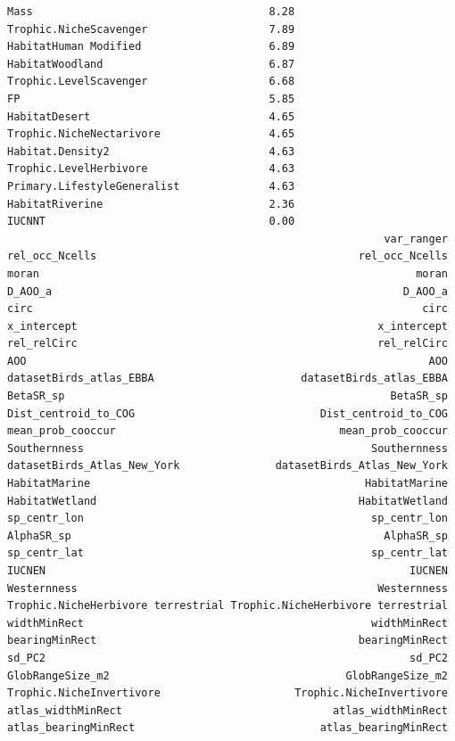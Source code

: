 \documentclass[
  letterpaper,
  DIV=11,
  numbers=noendperiod]{scrreprt}
\begin{document}
\begin{verbatim}
Mass                                     8.28
Trophic.NicheScavenger                   7.89
HabitatHuman Modified                    6.89
HabitatWoodland                          6.87
Trophic.LevelScavenger                   6.68
FP                                       5.85
HabitatDesert                            4.65
Trophic.NicheNectarivore                 4.65
Habitat.Density2                         4.63
Trophic.LevelHerbivore                   4.63
Primary.LifestyleGeneralist              4.63
HabitatRiverine                          2.36
IUCNNT                                   0.00
                                                           var_ranger
rel_occ_Ncells                                         rel_occ_Ncells
moran                                                           moran
D_AOO_a                                                       D_AOO_a
circ                                                             circ
x_intercept                                               x_intercept
rel_relCirc                                               rel_relCirc
AOO                                                               AOO
datasetBirds_atlas_EBBA                       datasetBirds_atlas_EBBA
BetaSR_sp                                                   BetaSR_sp
Dist_centroid_to_COG                             Dist_centroid_to_COG
mean_prob_cooccur                                   mean_prob_cooccur
Southernness                                             Southernness
datasetBirds_Atlas_New_York               datasetBirds_Atlas_New_York
HabitatMarine                                           HabitatMarine
HabitatWetland                                         HabitatWetland
sp_centr_lon                                             sp_centr_lon
AlphaSR_sp                                                 AlphaSR_sp
sp_centr_lat                                             sp_centr_lat
IUCNEN                                                         IUCNEN
Westernness                                               Westernness
Trophic.NicheHerbivore terrestrial Trophic.NicheHerbivore terrestrial
widthMinRect                                             widthMinRect
bearingMinRect                                         bearingMinRect
sd_PC2                                                         sd_PC2
GlobRangeSize_m2                                     GlobRangeSize_m2
Trophic.NicheInvertivore                     Trophic.NicheInvertivore
atlas_widthMinRect                                 atlas_widthMinRect
atlas_bearingMinRect                             atlas_bearingMinRect

\end{verbatim}
\end{document}
